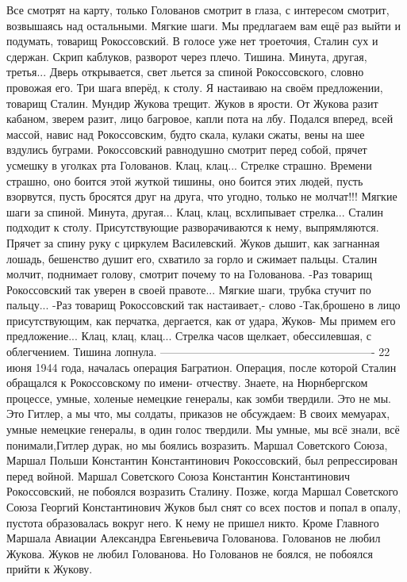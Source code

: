Все смотрят на карту, только Голованов смотрит в глаза, с интересом смотрит, возвышаясь над остальными.
Мягкие шаги.
Мы предлагаем вам ещё раз выйти и подумать, товарищ Рокоссовский.
В голосе уже нет троеточия, Сталин сух и сдержан.
Скрип каблуков, разворот через плечо.
Тишина.
Минута, другая, третья...
Дверь открывается, свет льется за спиной Рокоссовского, словно провожая его.
Три шага вперёд, к столу.
Я настаиваю на своём предложении, товарищ Сталин.
Мундир Жукова трещит.
Жуков в ярости.
От Жукова разит кабаном, зверем разит, лицо багровое, капли пота на лбу.
Подался вперед, всей массой, навис над Рокоссовским, будто скала, кулаки сжаты, вены на шее вздулись буграми.
Рокоссовский равнодушно смотрит перед собой, прячет усмешку в уголках рта Голованов.
Клац, клац...
Стрелке страшно.
Времени страшно, оно боится этой жуткой тишины, оно боится этих людей, пусть взорвутся, пусть бросятся друг на друга, что угодно, только не молчат!!!
Мягкие шаги за спиной.
Минута, другая...
Клац, клац, всхлипывает стрелка...
Сталин подходит к столу.
Присутствующие разворачиваются к нему, выпрямляются.
Прячет за спину руку с циркулем Василевский.
Жуков дышит, как загнанная лошадь, бешенство душит его, схватило за горло и сжимает пальцы.
Сталин молчит, поднимает голову, смотрит почему то на Голованова.
-Раз товарищ Рокоссовский так уверен в своей правоте...
Мягкие шаги, трубка стучит по пальцу...
-Раз товарищ Рокоссовский так настаивает,- слово -Так,брошено в лицо присутствующим, как перчатка, дергается, как от удара, Жуков- Мы примем его предложение...
Клац, клац, клац...
Стрелка часов щелкает, обессилевшая, с облегчением.
Тишина лопнула.
———————————————————-
22 июня 1944 года, началась операция Багратион.
Операция, после которой Сталин обращался к Рокоссовскому по имени- отчеству.
Знаете, на Нюрнбергском процессе, умные, холеные немецкие генералы, как зомби твердили.
Это не мы.
Это Гитлер, а мы что, мы солдаты, приказов не обсуждаем:
В своих мемуарах, умные немецкие генералы, в один голос твердили.
Мы умные, мы всё знали, всё понимали,Гитлер дурак, но мы боялись возразить.
Маршал Советского Союза, Маршал Польши Константин Константинович Рокоссовский, был репрессирован перед войной.
Маршал Советского Союза Константин Константинович Рокоссовский, не побоялся возразить Сталину.
Позже, когда Маршал Советского Союза Георгий Константинович Жуков был снят со всех постов и попал в опалу, пустота образовалась вокруг него.
К нему не пришел никто.
Кроме Главного Маршала Авиации Александра Евгеньевича Голованова.
Голованов не любил Жукова.
Жуков не любил Голованова.
Но Голованов не боялся, не побоялся прийти к Жукову.
